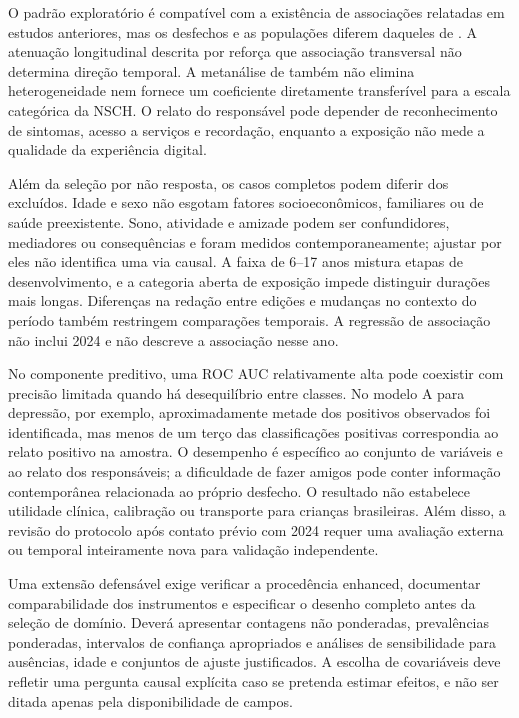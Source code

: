 ﻿\documentclass[12pt]{article}
\begin{document}
O padrão exploratório é compatível com a existência de associações relatadas em estudos anteriores, mas os desfechos e as populações diferem daqueles de \cite{boers2019,paulich2021}. A atenuação longitudinal descrita por \cite{li2025} reforça que associação transversal não determina direção temporal. A metanálise de \cite{gao2024} também não elimina heterogeneidade nem fornece um coeficiente diretamente transferível para a escala categórica da NSCH. O relato do responsável pode depender de reconhecimento de sintomas, acesso a serviços e recordação, enquanto a exposição não mede a qualidade da experiência digital.

Além da seleção por não resposta, os casos completos podem diferir dos excluídos. Idade e sexo não esgotam fatores socioeconômicos, familiares ou de saúde preexistente. Sono, atividade e amizade podem ser confundidores, mediadores ou consequências e foram medidos contemporaneamente; ajustar por eles não identifica uma via causal. A faixa de 6--17 anos mistura etapas de desenvolvimento, e a categoria aberta de exposição impede distinguir durações mais longas. Diferenças na redação entre edições e mudanças no contexto do período também restringem comparações temporais. A regressão de associação não inclui 2024 e não descreve a associação nesse ano.

No componente preditivo, uma ROC AUC relativamente alta pode coexistir com precisão limitada quando há desequilíbrio entre classes. No modelo A para depressão, por exemplo, aproximadamente metade dos positivos observados foi identificada, mas menos de um terço das classificações positivas correspondia ao relato positivo na amostra. O desempenho é específico ao conjunto de variáveis e ao relato dos responsáveis; a dificuldade de fazer amigos pode conter informação contemporânea relacionada ao próprio desfecho. O resultado não estabelece utilidade clínica, calibração ou transporte para crianças brasileiras. Além disso, a revisão do protocolo após contato prévio com 2024 requer uma avaliação externa ou temporal inteiramente nova para validação independente.

Uma extensão defensável exige verificar a procedência enhanced, documentar comparabilidade dos instrumentos e especificar o desenho completo antes da seleção de domínio. Deverá apresentar contagens não ponderadas, prevalências ponderadas, intervalos de confiança apropriados e análises de sensibilidade para ausências, idade e conjuntos de ajuste justificados. A escolha de covariáveis deve refletir uma pergunta causal explícita caso se pretenda estimar efeitos, e não ser ditada apenas pela disponibilidade de campos.
\end{document}
